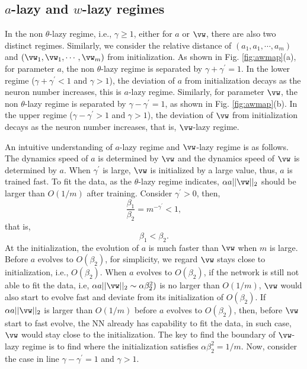 \documentclass{article}
\begin{document}
\subsection{$a$-lazy and $w$-lazy regimes}

In the non $\theta$-lazy regime, i.e., $\gamma\geq1$, either for $a$ or $\vw$, there are also two distinct regimes. Similarly, we consider the relative distance of $(a_1, a_1, \cdots, a_m)$ and $(\vw_1, \vw_1, \cdots, \vw_m)$ from initialization.  As shown in Fig. \ref{fig:awmap}(a), for parameter $a$, the non $\theta$-lazy regime is separated by $\gamma+\gamma^{\prime}=1$. In the lower regime ($\gamma+\gamma^{\prime}<1$ and $\gamma>1$), the deviation of $a$ from initialization decays as the neuron number increases, this is $a$-lazy regime. Similarly, for parameter $\vw$, the non $\theta$-lazy regime is separated by $\gamma-\gamma^{\prime}=1$,  as shown in Fig. \ref{fig:awmap}(b). In the upper regime ($\gamma-\gamma^{\prime}>1$ and $\gamma>1$), the deviation of $\vw$ from initialization decays as the neuron number increases, that is,  $\vw$-lazy regime.

An intuitive understanding of  $a$-lazy regime and  $\vw$-lazy regime is as follows. The dynamics speed of $a$ is determined by $\vw$ and the dynamics speed of  $\vw$ is determined by $a$. When $\gamma^{\prime}$ is large, $\vw$ is initialized by a large value, thus, $a$ is trained fast. To fit the data, as the $\theta$-lazy regime indicates, $\alpha a ||\vw||_{2}$ should be larger than $O(1/m)$ after training. Consider $\gamma^{\prime}>0$, then,
\[
    \frac{\beta_1}{\beta_2}=m^{-\gamma^{\prime}}<1,
\]
that is,
\[
    \beta_1<\beta_2.
\]
At the initialization, the evolution of $a$ is much faster than $\vw$ when $m$ is large. Before $a$ evolves to $O(\beta_2)$, for simplicity, we regard $\vw$ stays close to initialization, i.e., $O(\beta_2)$. When $a$ evolves to $O(\beta_2)$, if the network is still not able to fit the data, i.e, $\alpha a ||\vw||_{2}\sim \alpha \beta_{2}^{2})$ is no larger than $O(1/m)$, $\vw$ would also start to evolve fast and deviate from its initialization of $O(\beta_2)$. If  $\alpha a ||\vw||_{2}$ is   larger than $O(1/m)$ before $a$ evolves to $O(\beta_2)$, then, before $\vw$ start to fast evolve, the NN already has capability to fit the data, in such case, $\vw$ would stay close to the initialization. The key to find the boundary of $\vw$-lazy regime is to find where the initialization satisfies $\alpha \beta_{2}^{2}=1/m$.  Now, consider the case in line $\gamma-\gamma^{\prime}=1$ and $\gamma>1$.
\end{document}
